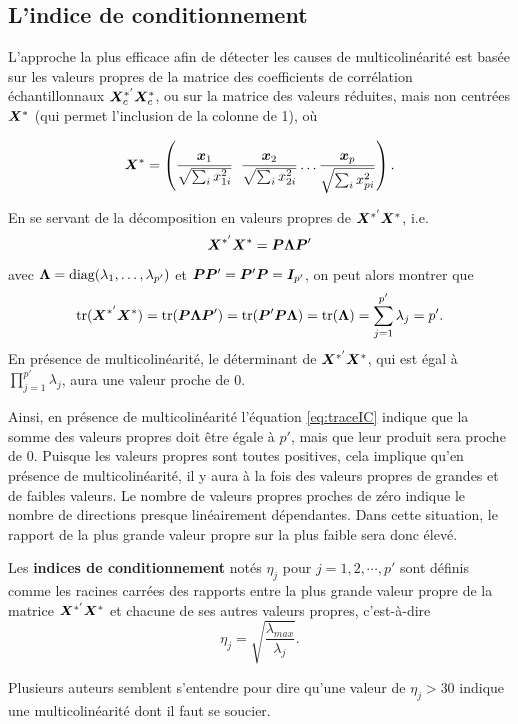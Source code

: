 \subsection{L'indice de conditionnement}

\label{sec:FacteurDeConditionnement}
L'approche la plus efficace afin de détecter les causes de multicolinéarité est basée sur les valeurs propres de la matrice des coefficients de corrélation échantillonnaux $\bm{X}_c^{*'}\bm{X}_c^*$, ou sur la matrice des valeurs réduites, mais non centrées $\bm{X}^*$ (qui permet l'inclusion de la colonne de 1), où 

$$\bm{X}^*=\left(\frac{{\bm{x}}_1}{\sqrt{\sum_i x_{1i}^2} }\;\;\frac{{\bm{x}}_2}{\sqrt{\sum_i x_{2i}^2}} \ldots \frac{{\bm{x}}_p}{\sqrt{\sum_i x_{pi}^2}}  \right).$$

En se servant de la décomposition en valeurs propres de $\bm{X}^{*'}\bm{X}^*$, i.e.
$$\bm{X}^{*'}\bm{X}^*={\bm{P}}{\bm{\Lambda}} {\bm{P}}'$$
avec ${\bm{\Lambda}}=\text{diag}(\lambda_1,\ldots,\lambda_{p'})$ et ${\bm{P}}{\bm{P}}'= {\bm{P}}'{\bm{P}}={\bm{I}}_{p'}$, on peut alors montrer que
\begin{equation}
\text{tr}(\bm{X}^{*'}\bm{X}^*)=\text{tr}({\bm{P}}{\bm{\Lambda}} {\bm{P}}')=\mbox{tr}({\bm{P}}'{\bm{P}}{\bm{\Lambda}})=\mbox{tr}({\bm{\Lambda}})=\sum_{j=1}^{p'}\lambda_j=p'.
\label{eq:traceIC}
\end{equation}
En présence de multicolinéarité, le déterminant de $\bm{X}^{*'}\bm{X}^*$, qui est égal à $\prod\limits_{j=1}^{p'}\lambda_j$, aura une valeur proche de 0.



Ainsi, en présence de multicolinéarité l'équation \ref{eq:traceIC} indique que la somme des valeurs propres doit être égale à $p'$, mais que leur produit sera proche de 0. Puisque les valeurs propres sont toutes positives, cela implique qu'en présence de multicolinéarité, il y aura \`a la fois des valeurs propres de grandes et de faibles valeurs. Le nombre de valeurs propres proches de zéro indique le nombre de directions presque linéairement dépendantes. Dans cette situation, le rapport de la plus grande valeur propre sur la plus faible sera donc élevé.

Les \textbf{indices de conditionnement} notés $\eta_j$ pour ${j=1,2,\cdots,p'}$ sont définis comme les racines carrées des rapports entre la plus grande valeur propre de la matrice $\bm{X}^{*'}\bm{X}^*$ et chacune de ses autres valeurs propres, c'est-à-dire
$$\eta_j=\sqrt{\frac{\lambda_{max}}{\lambda_j}}.$$

Plusieurs auteurs semblent s'entendre pour dire qu'une valeur de $\eta_j > 30$ indique une multicolinéarité dont il faut se
soucier.

